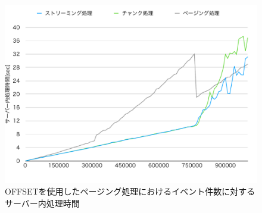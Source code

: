 \documentclass[../../../../../main]{subfiles}
\begin{document}
    \begin{figure}[H]
        \centering
        \includegraphics[width=12cm]{graph}
        \caption{OFFSETを使用したページング処理におけるイベント件数に対するサーバー内処理時間}
        \label{fig:each-way-server-time-app_1_1024-db_1_1024}
    \end{figure}
\end{document}
